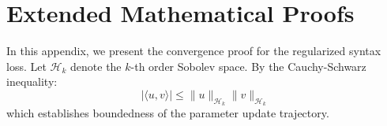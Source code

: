\documentclass[11pt,a4paper]{article}
\begin{document}
\appendix
\section{Extended Mathematical Proofs}
\label{sec:proofs}
In this appendix, we present the convergence proof for the regularized syntax loss.
Let $\mathcal{H}_k$ denote the $k$-th order Sobolev space. By the Cauchy-Schwarz inequality:
\begin{equation}
|\langle u, v \rangle| \le \|u\|_{\mathcal{H}_k} \|v\|_{\mathcal{H}_k}
\end{equation}
which establishes boundedness of the parameter update trajectory.
\end{document}
